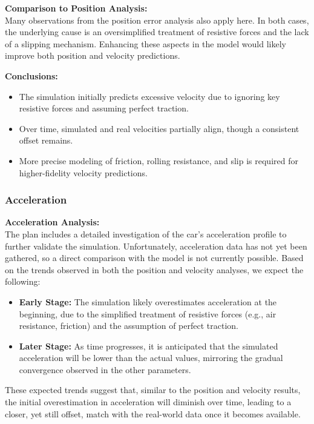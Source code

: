 \documentclass[12pt, titlepage]{article}
\begin{document}
\textbf{Comparison to Position Analysis:}\\
Many observations from the position error analysis also apply here. In both cases, the underlying cause is an oversimplified treatment of resistive forces and the lack of a slipping mechanism. Enhancing these aspects in the model would likely improve both position and velocity predictions.

\textbf{Conclusions:}
\begin{itemize}
    \item The simulation initially predicts excessive velocity due to ignoring key resistive forces and assuming perfect traction.
    \item Over time, simulated and real velocities partially align, though a consistent offset remains.
    \item More precise modeling of friction, rolling resistance, and slip is required for higher-fidelity velocity predictions.
\end{itemize}

\subsubsection{Acceleration}

\textbf{Acceleration Analysis:}\\
The plan includes a detailed investigation of the car's acceleration profile to further validate the simulation. Unfortunately, acceleration data has not yet been gathered, so a direct comparison with the model is not currently possible. Based on the trends observed in both the position and velocity analyses, we expect the following:

\begin{itemize}
    \item \textbf{Early Stage:} The simulation likely overestimates acceleration at the beginning, due to the simplified treatment of resistive forces (e.g., air resistance, friction) and the assumption of perfect traction.
    \item \textbf{Later Stage:} As time progresses, it is anticipated that the simulated acceleration will be lower than the actual values, mirroring the gradual convergence observed in the other parameters.
\end{itemize}

These expected trends suggest that, similar to the position and velocity results, the initial overestimation in acceleration will diminish over time, leading to a closer, yet still offset, match with the real-world data once it becomes available.
\end{document}
